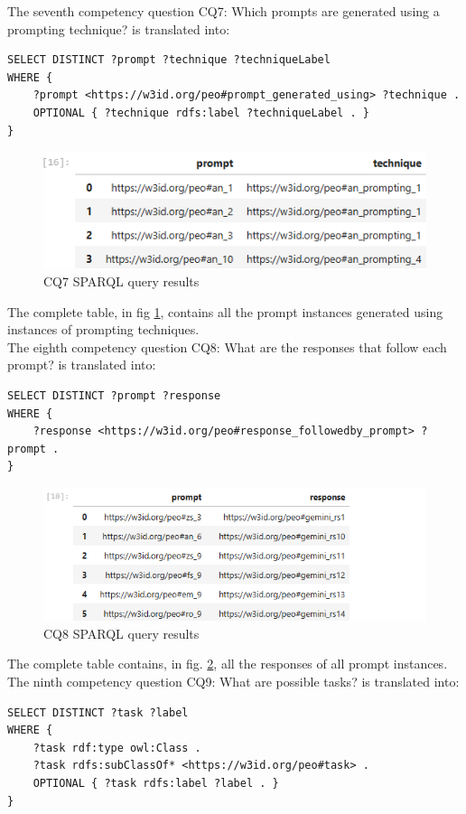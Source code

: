 The seventh competency question CQ7: Which prompts are generated using a prompting technique? is translated into:
\begin{lstlisting}
SELECT DISTINCT ?prompt ?technique ?techniqueLabel
WHERE {
    ?prompt <https://w3id.org/peo#prompt_generated_using> ?technique .
    OPTIONAL { ?technique rdfs:label ?techniqueLabel . }
}
\end{lstlisting}

\begin{figure}[H]
    \centering
    \includegraphics[width=0.9\linewidth]{Figures/fig_53.png}
    \caption{CQ7 SPARQL query results}
    \label{fig:53}
\end{figure}
The complete table, in fig \ref{fig:53}, contains all the prompt instances generated using instances of prompting techniques.\\

The eighth competency question CQ8: What are the responses that follow each prompt? is translated into:
\begin{lstlisting}
SELECT DISTINCT ?prompt ?response
WHERE {
    ?response <https://w3id.org/peo#response_followedby_prompt> ?prompt .
}    
\end{lstlisting}

\begin{figure}[H]
    \centering
    \includegraphics[width=0.9\linewidth]{Figures/fig_54.png}
    \caption{CQ8 SPARQL query results}
    \label{fig:54}
\end{figure}
The complete table contains, in fig. \ref{fig:54}, all the responses of all prompt instances.\\

The ninth competency question CQ9: What are possible tasks? is translated into:
\begin{lstlisting}
SELECT DISTINCT ?task ?label
WHERE {
    ?task rdf:type owl:Class .
    ?task rdfs:subClassOf* <https://w3id.org/peo#task> .
    OPTIONAL { ?task rdfs:label ?label . }
}    
\end{lstlisting}


